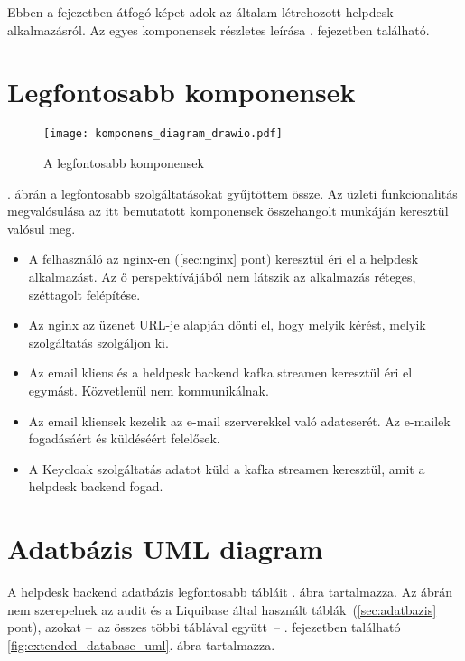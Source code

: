 Ebben a fejezetben átfogó képet adok az általam létrehozott helpdesk alkalmazásról. Az egyes komponensek részletes leírása . fejezetben található.

\section{Legfontosabb komponensek}

\begin{figure}[hbt] 
	\centering
	\texttt{[image: komponens\_diagram\_drawio.pdf]}
	\caption{A legfontosabb komponensek}
	\label{fig:komponens_diagram}
\end{figure}

. ábrán a legfontosabb szolgáltatásokat gyűjtöttem össze. Az üzleti funkcionalitás megvalósulása az itt bemutatott komponensek összehangolt munkáján keresztül valósul meg.


\begin{itemize}
	\item A felhasználó az nginx-en (\ref{sec:nginx} pont) keresztül éri el a helpdesk alkalmazást. Az ő perspektívájából nem látszik az alkalmazás réteges, széttagolt felépítése.
	\item Az nginx az üzenet URL-je alapján dönti el, hogy melyik kérést, melyik szolgáltatás szolgáljon ki.
	\item Az email kliens és a heldpesk backend kafka streamen keresztül éri el egymást. Közvetlenül nem kommunikálnak.
	\item Az email kliensek kezelik az e-mail szerverekkel való adatcserét. Az e-mailek fogadásáért és küldéséért felelősek.
	\item A Keycloak szolgáltatás adatot küld a kafka streamen keresztül, amit a helpdesk backend fogad.
\end{itemize}


\section{Adatbázis UML diagram}\label{sec:felepites_adatbazis}
A helpdesk backend adatbázis legfontosabb tábláit . ábra tartalmazza. Az ábrán nem szerepelnek az audit és a Liquibase által használt táblák~(\ref{sec:adatbazis} pont), azokat --~az összes többi táblával együtt~-- . fejezetben található \ref{fig:extended_database_uml}. ábra tartalmazza.
 
